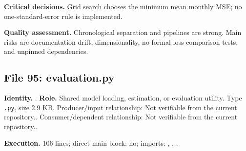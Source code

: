 \documentclass[
  11pt,
  a4paper]{article}
\begin{document}
\textbf{Critical decisions.} Grid search chooses the minimum mean
monthly MSE; no one-standard-error rule is implemented.

\textbf{Quality assessment.} Chronological separation and pipelines are
strong. Main risks are documentation drift, dimensionality, no formal
loss-comparison tests, and unpinned dependencies.

\subsection{File 95: evaluation.py}\label{file-6347842997595616564}

\textbf{Identity.} . \textbf{Role.}
Shared model loading, estimation, or evaluation utility. Type
\texttt{.py}, size 2.9 KB. Producer/input relationship: Not verifiable
from the current repository.. Consumer/dependent relationship: Not
verifiable from the current repository..

\textbf{Execution.} 106 lines; direct main block: no; imports:
, ,
.
\end{document}
